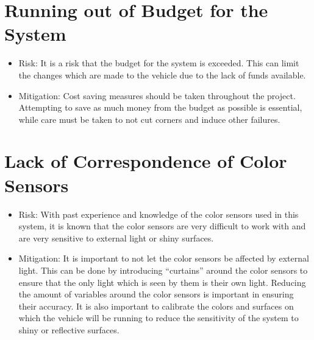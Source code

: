 \documentclass[11pt]{report}
\begin{document}
\section{Running out of Budget for the System}
\begin{itemize}
    \item Risk: It is a risk that the budget for the system is exceeded. This can limit the changes which are made to the vehicle due to the lack of funds available. 
    \item Mitigation: Cost saving measures should be taken throughout the project. Attempting to save as much money from the budget as possible is essential, while care must be taken to not cut corners and induce other failures.
\end{itemize}
\section{Lack of Correspondence of Color Sensors}
\begin{itemize}
    \item Risk: With past experience and knowledge of the color sensors used in this system, it is known that the color sensors are very difficult to work with and are very sensitive to external light or shiny surfaces.
    \item Mitigation: It is important to not let the color sensors be affected by external light. This can be done by introducing ``curtains'' around the color sensors to ensure that the only light which is seen by them is their own light. Reducing the amount of variables around the color sensors is important in ensuring their accuracy. It is also important to calibrate the colors and surfaces on which the vehicle will be running to reduce the sensitivity of the system to shiny or reflective surfaces. 
\end{itemize}
\end{document}
